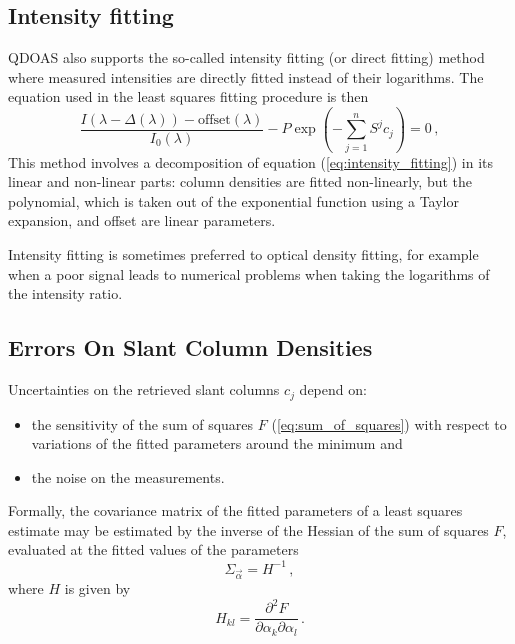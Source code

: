 \subsection{Intensity fitting}\label{sec:intensity-fitting}
QDOAS also supports the so-called intensity fitting (or direct
fitting) method where measured intensities are directly fitted instead
of their logarithms. The equation used in the least squares fitting
procedure is then
\begin{equation}
  \label{eq:intensity_fitting}
  \frac{I(\lambda -\Delta(\lambda)) - \mathrm{offset}(\lambda)}{ I_0(\lambda)} - P \exp(-\sum_{j=1}^n S^jc_j) = 0\,,
\end{equation}
This method involves a decomposition of equation
(\ref{eq:intensity_fitting}) in its linear and non-linear parts:
column densities are fitted non-linearly, but the polynomial, which is
taken out of the exponential function using a Taylor expansion, and
offset are linear parameters.

Intensity fitting is sometimes preferred to optical density fitting,
for example when a poor signal leads to numerical problems when taking
the logarithms of the intensity ratio.

\subsection{Errors On Slant Column Densities}\label{sec:errors-slant-column}
Uncertainties on the retrieved slant columns $c_j$ depend on:
 \begin{itemize}
 \item the sensitivity of the sum of squares $F$
   (\ref{eq:sum_of_squares}) with respect to variations of the fitted
   parameters around the minimum and
 \item the noise on the measurements.
 \end{itemize}

 Formally, the covariance matrix of the fitted parameters of a least
 squares estimate may be estimated by the inverse of the Hessian of
 the sum of squares $F$, evaluated at the fitted values of the
 parameters
\begin{equation}
  \label{eq:slnterr_general}
  \Sigma_{\vec{\alpha}} = H^{-1}\,,
\end{equation}
where $H$ is given by
\begin{equation}
  \label{eq:hessian}
  H_{kl} = \frac{\partial^2 F}{\partial \alpha_k \partial \alpha_l}\,.
\end{equation}

